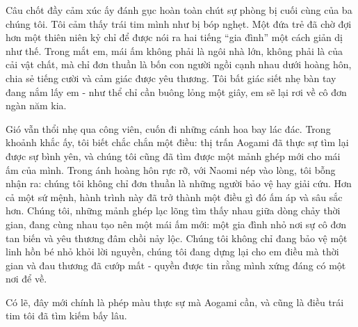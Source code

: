 \documentclass[../main.tex]{subfiles}
\begin{document}
Câu chốt đầy cảm xúc ấy đánh gục hoàn toàn chút sự phòng bị cuối cùng của ba chúng tôi. Tôi cảm thấy trái tim mình như bị bóp nghẹt. Một đứa trẻ đã chờ đợi hơn một thiên niên kỷ chỉ để được nói ra hai tiếng ``gia đình'' một cách giản dị như thế. Trong mắt em, mái ấm không phải là ngôi nhà lớn, không phải là của cải vật chất, mà chỉ đơn thuần là bốn con người ngồi cạnh nhau dưới hoàng hôn, chia sẻ tiếng cười và cảm giác được yêu thương. Tôi bất giác siết nhẹ bàn tay đang nắm lấy em - như thể chỉ cần buông lỏng một giây, em sẽ lại rơi về cô đơn ngàn năm kia.

Gió vẫn thổi nhẹ qua công viên, cuốn đi những cánh hoa bay lác đác. Trong khoảnh khắc ấy, tôi biết chắc chắn một điều: thị trấn Aogami đã thực sự tìm lại được sự bình yên, và chúng tôi cũng đã tìm được một mảnh ghép mới cho mái ấm của mình. Trong ánh hoàng hôn rực rỡ, với Naomi nép vào lòng, tôi bỗng nhận ra: chúng tôi không chỉ đơn thuần là những người bảo vệ hay giải cứu. Hơn cả một sứ mệnh, hành trình này đã trở thành một điều gì đó ấm áp và sâu sắc hơn. Chúng tôi, những mảnh ghép lạc lõng tìm thấy nhau giữa dòng chảy thời gian, đang cùng nhau tạo nên một mái ấm mới: một gia đình nhỏ nơi sự cô đơn tan biến và yêu thương đâm chồi nảy lộc. Chúng tôi không chỉ đang bảo vệ một linh hồn bé nhỏ khỏi lời nguyền, chúng tôi đang dựng lại cho em điều mà thời gian và đau thương đã cướp mất - quyền được tin rằng mình xứng đáng có một nơi để về.

Có lẽ, đây mới chính là phép màu thực sự mà Aogami cần, và cũng là điều trái tim tôi đã tìm kiếm bấy lâu.
\end{document}
